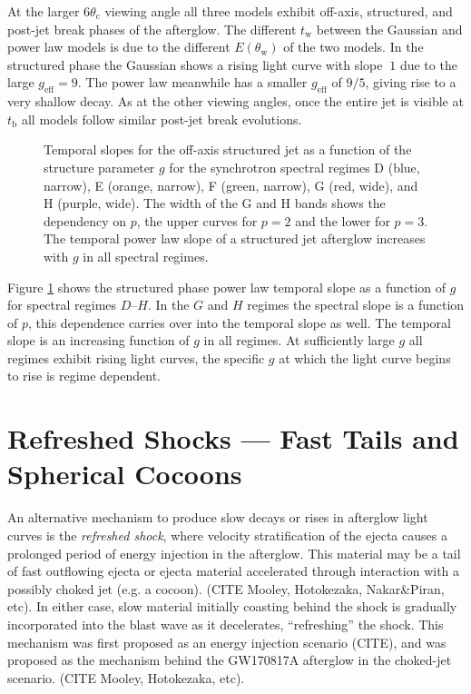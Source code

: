 \documentclass[twocolumn]{aastex62}
\newcommand{\gwbns}{GW170817A}
\newcommand{\tW}{\ensuremath{t_{\mathrm{w}}}}
\newcommand{\tb}{\ensuremath{t_{\mathrm{b}}}}
\newcommand{\thW}{\ensuremath{\theta_{\mathrm{w}}}}
\newcommand{\thC}{\ensuremath{\theta_{\mathrm{c}}}}
\newcommand{\geff}{\ensuremath{g_{\mathrm{eff}}}}
\begin{document}
At the larger $6\thC$ viewing angle all three models exhibit off-axis, structured, and post-jet break phases of the afterglow.  The different $\tW$ between the Gaussian and power law models is due to the different $E(\thW)$ of the two models. In the structured phase the Gaussian shows a rising light curve with slope $~1$ due to the large $\geff = 9$.  The power law meanwhile has a smaller $\geff$ of $9/5$, giving rise to a very shallow decay. As at the other viewing angles, once the entire jet is visible at $\tb$ all models follow similar post-jet break evolutions.

%
%

\begin{figure}
	\caption{Temporal slopes for the off-axis structured jet as a function of the structure parameter $g$ for the synchrotron spectral regimes D (blue, narrow), E (orange, narrow),  F (green, narrow), G (red, wide), and H (purple, wide).  The width of the G and H bands shows the dependency on $p$, the upper curves for $p=2$ and the lower for $p=3$.  The temporal power law slope of a structured jet afterglow increases with $g$ in all spectral regimes. \label{fig:slopesG}}
\end{figure}

Figure \ref{fig:slopesG} shows the structured phase power law temporal slope as a function of $g$ for spectral regimes $D$--$H$. In the $G$ and $H$ regimes the spectral slope is a function of $p$, this dependence carries over into the temporal slope as well. The temporal slope is an increasing function of $g$ in all regimes.  At sufficiently large $g$ all regimes exhibit rising light curves, the specific $g$ at which the light curve begins to rise is regime dependent.

\section{Refreshed Shocks --- Fast Tails and Spherical Cocoons}\label{sec:refreshedShocks}

An alternative mechanism to produce slow decays or rises in afterglow light curves is the \emph{refreshed shock}, where velocity stratification of the ejecta causes a prolonged period of energy injection in the afterglow.  This material may be a tail of fast outflowing ejecta or ejecta material accelerated through interaction with a possibly choked jet (e.g. a cocoon). (CITE Mooley, Hotokezaka, Nakar\&Piran, etc).  In either case, slow material initially coasting behind the shock is gradually incorporated into the blast wave as it decelerates, ``refreshing'' the shock.  This mechanism was first proposed as an energy injection scenario (CITE), and was proposed as the mechanism behind the \gwbns{} afterglow in the choked-jet scenario. (CITE Mooley, Hotokezaka, etc).
\end{document}
